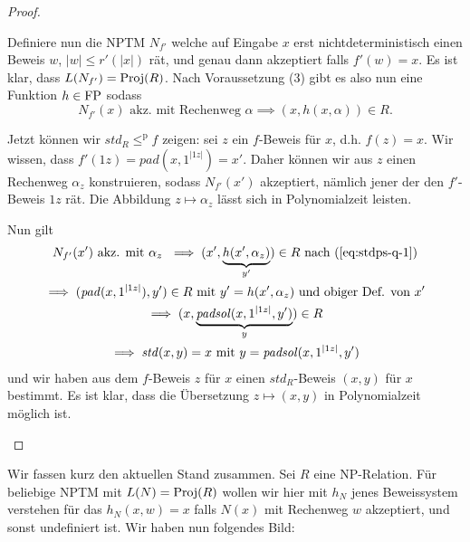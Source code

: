 \begin{proof}
\begin{prooflist}[label={}]
    Definiere nun die NPTM $N_{f'}$ welche auf Eingabe $x$ erst nichtdeterministisch einen Beweis $w$, $|w|\leq r'(|x|)$ rät, und genau dann akzeptiert falls $f'(w)=x$.
    Es ist klar, dass $L(N_{f'}) = \operatorname{Proj}(R)$.
    Nach Voraussetzung (3) gibt es also nun eine Funktion $h\in\mathrm{FP}$ sodass 
    \begin{equation} N_{f'}(x) \text{ akz. mit Rechenweg $\alpha$} \implies (x,h(x,\alpha))\in R.  \label{eq:stdps-q-1}
    \end{equation}

    Jetzt können wir $\mathit{std}_R \leq^\mathrm p f$ zeigen: sei $z$ ein $f$-Beweis für $x$, d.h. $f(z)=x$.
    Wir wissen, dass $f'(1z)=\mathit{pad}(x, 1^{|1z|})=x'$.
    Daher können wir aus $z$ einen Rechenweg $\alpha_z$ konstruieren, sodass $N_{f'}(x')$ akzeptiert, nämlich jener der den $f'$-Beweis $1z$ rät.
    Die Abbildung $z\mapsto \alpha_z$ lässt sich in Polynomialzeit leisten.

    Nun gilt
    \begin{gather*}
        N_{f'}(x') \text{ akz. mit $\alpha_z$ } \implies (x', \underbrace{h(x', \alpha_z)}_{y'})\in R \text{ nach (\ref{eq:stdps-q-1})}\\
        \implies (\mathit{pad}(x, 1^{|1z|}), y')\in R \text{ mit $y'=h(x', \alpha_z)$ und obiger Def. von $x'$} \\
        \implies (x, \underbrace{\mathit{padsol}(x, 1^{|1z|}, y')}_y) \in R\\
        \implies \mathit{std}(x, y)=x \text{ mit $y=\mathit{padsol}(x, 1^{|1z|}, y')$}
    \end{gather*}
    und wir haben aus dem $f$-Beweis $z$ für $x$ einen $\mathit{std}_R$-Beweis $(x,y)$ für $x$ bestimmt.
    Es ist klar, dass die Übersetzung $z\mapsto (x,y)$ in Polynomialzeit möglich ist.
\end{prooflist}
\end{proof}

Wir fassen kurz den aktuellen Stand zusammen. Sei $R$ eine NP-Relation. Für beliebige NPTM mit $L(N)=\operatorname{Proj}(R)$ wollen wir hier mit $h_N$ jenes Beweissystem verstehen für das $h_N(x,w)=x$ falls $N(x)$ mit Rechenweg $w$ akzeptiert, und sonst undefiniert ist.
Wir haben nun folgendes Bild:

